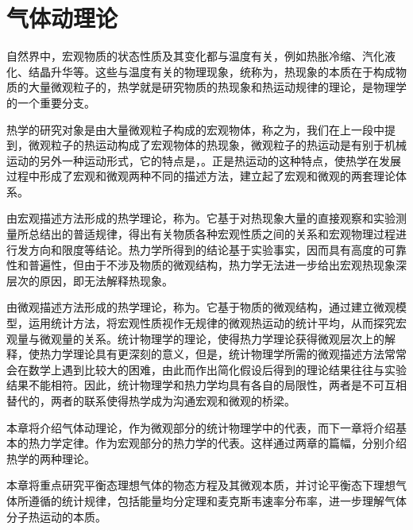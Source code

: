 \chapter{气体动理论}
自然界中，宏观物质的状态性质及其变化都与温度有关，例如热胀冷缩、汽化液化、结晶升华等。这些与温度有关的物理现象，统称为，热现象的本质在于构成物质的大量微观粒子的，热学就是研究物质的热现象和热运动规律的理论，是物理学的一个重要分支。

热学的研究对象是由大量微观粒子构成的宏观物体，称之为，我们在上一段中提到，微观粒子的热运动构成了宏观物体的热现象，微观粒子的热运动是有别于机械运动的另外一种运动形式，它的特点是，。正是热运动的这种特点，使热学在发展过程中形成了宏观和微观两种不同的描述方法，建立起了宏观和微观的两套理论体系。

由宏观描述方法形成的热学理论，称为。它基于对热现象大量的直接观察和实验测量所总结出的普适规律，得出有关物质各种宏观性质之间的关系和宏观物理过程进行发方向和限度等结论。热力学所得到的结论基于实验事实，因而具有高度的可靠性和普遍性，但由于不涉及物质的微观结构，热力学无法进一步给出宏观热现象深层次的原因，即无法解释热现象。

由微观描述方法形成的热学理论，称为。它基于物质的微观结构，通过建立微观模型，运用统计方法，将宏观性质视作无规律的微观热运动的统计平均，从而探究宏观量与微观量的关系。统计物理学的理论，使得热力学理论获得微观层次上的解释，使热力学理论具有更深刻的意义，但是，统计物理学所需的微观描述方法常常会在数学上遇到比较大的困难，由此而作出简化假设后得到的理论结果往往与实验结果不能相符。因此，统计物理学和热力学均具有各自的局限性，两者是不可互相替代的，两者的联系使得热学成为沟通宏观和微观的桥梁。

本章将介绍气体动理论，作为微观部分的统计物理学中的代表，而下一章将介绍基本的热力学定律。作为宏观部分的热力学的代表。这样通过两章的篇幅，分别介绍热学的两种理论。

本章将重点研究平衡态理想气体的物态方程及其微观本质，并讨论平衡态下理想气体所遵循的统计规律，包括能量均分定理和麦克斯韦速率分布率，进一步理解气体分子热运动的本质。






